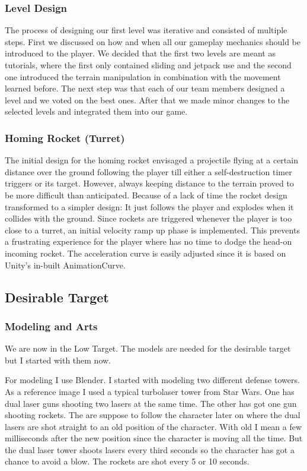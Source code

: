 \documentclass[12pt, letterpaper]{scrartcl}
\begin{document}
	\subsubsection{Level Design}
	The process of designing our first level was iterative and consisted of multiple steps. First we discussed on how and when all our gameplay mechanics should be introduced to the player. We decided that the first two levels are meant as tutorials, where the first only contained sliding and jetpack use and the second one introduced the terrain manipulation in combination with the movement learned before. The next step was that each of our team members designed a level and we voted on the best ones. After that we made minor changes to the selected levels and integrated them into our game.
	
	\subsubsection{Homing Rocket (Turret)}
	The initial design for the homing rocket envisaged a projectile flying at a certain distance over the ground following the player till either a self-destruction timer triggers or its target. However, always keeping distance to the terrain proved to be more difficult than anticipated. Because of a lack of time the rocket design transformed to a simpler design: It just follows the player and explodes when it collides with the ground.
	Since rockets are triggered whenever the player is too close to a turret, an initial velocity ramp up phase is implemented. This prevents a frustrating experience for the player where has no time to dodge the head-on incoming rocket. The acceleration curve is easily adjusted since it is based on Unity's in-built AnimationCurve.
	
	\subsection{Desirable Target}
	
	\subsubsection{Modeling and Arts}
	We are now in the Low Target. The models are needed for the desirable target but I started with them now. 
	
	For modeling I use Blender. I started with modeling two different defense towers. As a reference image I used a typical turbolaser tower from Star Wars.
	One has dual laser guns shooting two lasers at the same time. The other has got one gun shooting rockets. The are suppose to follow the character later on where the dual lasers are shot straight to an old position of the character. With old I mean a few milliseconds after the new position since the character is moving all the time. But the dual laser tower shoots lasers every third seconds so the character has got a chance to avoid a blow. The rockets are shot every 5 or 10 seconds.
	
\end{document}
